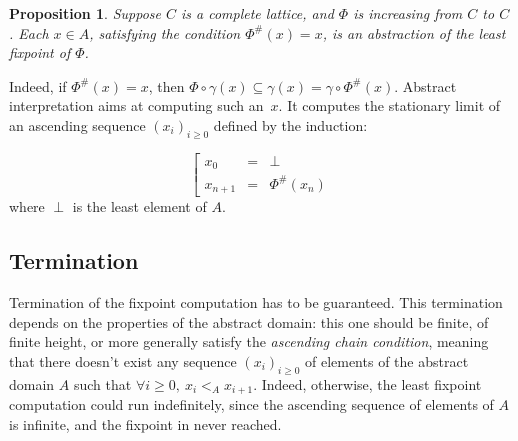 \documentclass[a4paper,english,titlepage,11pt]{report}
\newtheorem{proposition}[theorem]{Proposition}
\def\lfp{\textnormal{\it lfp}}
\begin{document}
\begin{proposition}
Suppose $C$ is a complete lattice, and $\Phi$ is increasing from $C$ to $C$.
Each $x \in A$, satisfying the condition $\Phi^\#(x) = x$, is an abstraction of
the least fixpoint of $\Phi$.
\end{proposition}

Indeed, if $\Phi^\#(x) = x$, then $\Phi \circ \gamma (x) \subseteq \gamma(x)
= \gamma \circ \Phi^\#(x)$. Abstract interpretation aims at computing
such an~$x$. It computes the stationary limit of an ascending sequence
$(x_i)_{i \geq 0}$ defined by the induction:

$$\left[
\begin{array}{lll}
x_0 &=& \perp \\
x_{n+1} &=& \Phi^\#(x_n)
\end{array}
\right.
$$
where $\perp$ is the least element of $A$.
%
%
%
%


\subsection{Termination}

Termination of the fixpoint computation has to be guaranteed. This termination
depends on the properties of the abstract domain:
this one should be finite, of finite height,
or more generally satisfy the \emph{ascending chain condition},
meaning that there doesn't exist
any sequence $(x_i)_{i \geq 0}$ of elements of the abstract domain $A$ such that
$\forall i \geq 0,\ x_i <_A x_{i+1}$. Indeed, otherwise, the least fixpoint
computation could run indefinitely, since the ascending sequence of elements of
$A$ is infinite, and the fixpoint in never reached.
\end{document}

